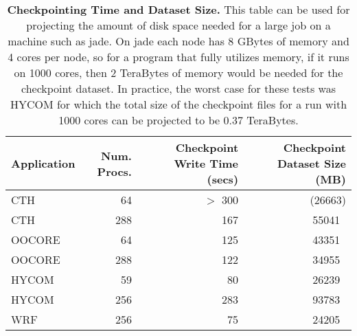 \documentclass[12pt]{article}
\begin{document}
\begin{table}[th]
\vspace*{2ex}
\begin{center}
\begin{tabular}{|l|r|r|r|} \hline
Application & Num. Procs. &
 Checkpoint Write Time (secs) & Checkpoint Dataset Size (MB) \\
\hline
CTH     &   64       & $>$ 300    &   (26663)       \\
CTH     &  288       &     167    &    55041  $\:$  \\
OOCORE  &   64       &     125    &    43351  $\:$  \\
OOCORE  &  288       &     122    &    34955  $\:$  \\
HYCOM   &   59       &      80    &    26239  $\:$  \\
HYCOM   &  256       &     283    &    93783  $\:$  \\
WRF     &  256       &      75    &    24205  $\:$  \\
\hline
\end{tabular}
\end{center}
\caption[Checkpointing Time and Dataset Size.]{
{\bf Checkpointing Time and Dataset Size.}
This table can be used for projecting the amount of disk space
needed for a large job on a machine such as jade.
On jade each node has 8 GBytes of memory and 4 cores per node,
so for a program that fully utilizes memory,
if it runs on 1000 cores,
then 2 TeraBytes of memory would be needed for the checkpoint dataset.
In practice, the worst case for these tests was HYCOM
for which the total size of the checkpoint files for a run
with 1000 cores can be projected to be 0.37 TeraBytes.
}
\vspace*{0.5cm}
\label{tab:time-dataset-size}
\end{table}

\clearpage
\end{document}
